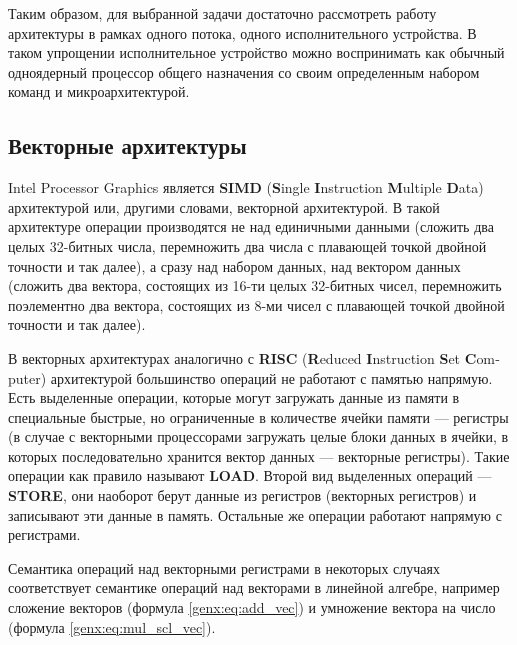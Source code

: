 Таким образом, для выбранной задачи достаточно рассмотреть работу архитектуры в рамках одного потока, одного исполнительного устройства.
В таком упрощении исполнительное устройство можно воспринимать как обычный одноядерный процессор общего назначения со своим определенным набором команд и микроархитектурой.

\subsection{Векторные архитектуры}

\foreignlanguage{english}{Intel Processor Graphics} является \textbf{SIMD} (\foreignlanguage{english}{\textbf{S}ingle \textbf{I}nstruction \textbf{M}ultiple \textbf{D}ata}) архитектурой или, другими словами, векторной архитектурой.
В такой архитектуре операции производятся не над единичными данными (сложить два целых 32-битных числа, перемножить два числа с плавающей точкой двойной точности и так далее), а сразу над набором данных, над вектором данных (сложить два вектора, состоящих из 16-ти целых 32-битных чисел, перемножить поэлементно два вектора, состоящих из 8-ми чисел с плавающей точкой двойной точности и так далее).

В векторных архитектурах аналогично с \foreignlanguage{english}{\textbf{RISC} (\textbf{R}educed \textbf{I}nstruction \textbf{S}et \textbf{C}omputer)} архитектурой большинство операций не работают с памятью напрямую. Есть выделенные операции, которые могут загружать данные из памяти в специальные быстрые, но ограниченные в количестве ячейки памяти --- регистры (в случае с векторными процессорами загружать целые блоки данных в ячейки, в которых последовательно хранится вектор данных --- векторные регистры).
Такие операции как правило называют \textbf{LOAD}.
Второй вид выделенных операций --- \textbf{STORE}, они наоборот берут данные из регистров (векторных регистров) и записывают эти данные в память.
Остальные же операции работают напрямую с регистрами\cite[с.~264]{hennessy-patterson}.

Семантика операций над векторными регистрами в некоторых случаях соответствует семантике операций над векторами в линейной алгебре, например сложение векторов (формула \ref{genx:eq:add_vec}) и умножение вектора на число (формула \ref{genx:eq:mul_scl_vec}).

